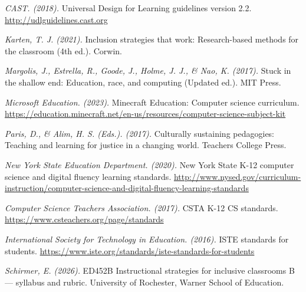 \documentclass[12pt]{article}
\begin{document}
\begin{flushleft}
\setlength{\parindent}{-0.4in}
\setlength{\leftskip}{0.4in}
\setlength{\parskip}{6pt}

\textit{CAST. (2018).} Universal Design for Learning guidelines version 2.2. \url{http://udlguidelines.cast.org}

\textit{Karten, T. J. (2021).} Inclusion strategies that work: Research-based methods for the classroom (4th ed.). Corwin.

\textit{Margolis, J., Estrella, R., Goode, J., Holme, J. J., \& Nao, K. (2017).} Stuck in the shallow end: Education, race, and computing (Updated ed.). MIT Press.

\textit{Microsoft Education. (2023).} Minecraft Education: Computer science curriculum. \url{https://education.minecraft.net/en-us/resources/computer-science-subject-kit}

\textit{Paris, D., \& Alim, H. S. (Eds.). (2017).} Culturally sustaining pedagogies: Teaching and learning for justice in a changing world. Teachers College Press.

\textit{New York State Education Department. (2020).} New York State K-12 computer science and digital fluency learning standards. \url{http://www.nysed.gov/curriculum-instruction/computer-science-and-digital-fluency-learning-standards}

\textit{Computer Science Teachers Association. (2017).} CSTA K-12 CS standards. \url{https://www.csteachers.org/page/standards}

\textit{International Society for Technology in Education. (2016).} ISTE standards for students. \url{https://www.iste.org/standards/iste-standards-for-students}

\textit{Schirmer, E. (2026).} ED452B Instructional strategies for inclusive classrooms B --- syllabus and rubric. University of Rochester, Warner School of Education.

\end{flushleft}
\end{document}
